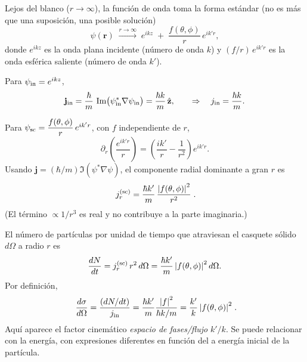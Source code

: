 Lejos del blanco ($r\to\infty$), la función de onda toma la forma estándar (no es más que una suposición, una posible solución)
\begin{equation}
\psi(\mathbf r)\;\xrightarrow{r\to\infty}\; e^{ik z}
\;+\; \frac{f(\theta,\phi)}{r}\,e^{ik'r},
\end{equation}
donde $e^{ik z}$ es la onda plana incidente (número de onda $k$) y
$(f/r)\,e^{ik'r}$ es la onda esférica saliente (número de onda $k'$).

Para $\psi_{\rm in}=e^{ikz}$,
\begin{equation}
\mathbf j_{\rm in}=\frac{\hbar}{m}\,\Im\!\big(\psi_{\rm in}^*\nabla\psi_{\rm in}\big)
=\frac{\hbar k}{m}\,\hat{\mathbf z},
\qquad
\Rightarrow\quad
j_{\rm in}=\frac{\hbar k}{m}.
\end{equation}

Para $\psi_{\rm sc}=\dfrac{f(\theta,\phi)}{r}\,e^{ik'r}$, con $f$ independiente de $r$,
\begin{equation}
\partial_r\!\left(\frac{e^{ik'r}}{r}\right)
=\left(\frac{ik'}{r}-\frac{1}{r^2}\right)e^{ik'r}.
\end{equation}
Usando $\mathbf j=(\hbar/m)\Im(\psi^*\nabla\psi)$, el componente radial dominante a gran $r$ es
\begin{equation}
{\;j_r^{(\rm sc)}=\frac{\hbar k'}{m}\,\frac{\abs{f(\theta,\phi)}^2}{r^2}\;}.
\end{equation}
(El término $\propto 1/r^3$ es real y no contribuye a la parte imaginaria.)

El número de partículas por unidad de tiempo que atraviesan el casquete sólido $d\Omega$ a radio $r$ es
\begin{equation}
\frac{dN}{dt}=j_r^{(\rm sc)}\,r^2\,d\Omega
= \frac{\hbar k'}{m}\,\abs{f(\theta,\phi)}^2\, d\Omega.
\end{equation}
Por definición,
\begin{equation}
{\;
\frac{d\sigma}{d\Omega}
=\frac{(dN/dt)}{j_{\rm in}}
=\frac{\hbar k'}{m}\frac{\abs{f}^2}{\hbar k/m}
=\frac{k'}{k}\,\abs{f(\theta,\phi)}^2\;}.
\end{equation}
Aquí aparece el factor cinemático \emph{espacio de fases/flujo} $k'/k$. Se puede relacionar con la energía, con expresiones diferentes en función del a energía inicial de la partícula. 


